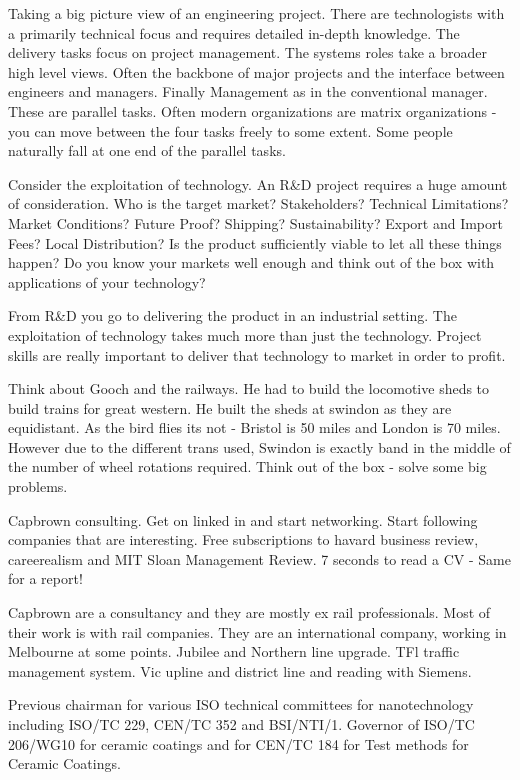 Taking a big picture view of an engineering project. There are technologists with a primarily technical focus and requires detailed in-depth knowledge. The delivery tasks focus on project management. The systems roles take a broader high level views. Often the backbone of major projects and the interface between engineers and managers. Finally Management as in the conventional manager. These are parallel tasks. Often modern organizations are matrix organizations - you can move between the four tasks freely to some extent. Some people naturally fall at one end of the parallel tasks.

Consider the exploitation of technology. An R\&D project requires a huge amount of consideration. Who is the target market? Stakeholders? Technical Limitations? Market Conditions? Future Proof? Shipping? Sustainability? Export and Import Fees? Local Distribution? Is the product sufficiently viable to let all these things happen? Do you know your markets well enough and think out of the box with applications of your technology?

From R\&D you go to delivering the product in an industrial setting. The exploitation of technology takes much more than just the technology. Project skills are really important to deliver that technology to market in order to profit.

Think about Gooch and the railways. He had to build the locomotive sheds to build trains for great western. He built the sheds at swindon as they are equidistant. As the bird flies its not - Bristol is 50 miles and London is 70 miles. However due to the different trans used, Swindon is exactly band in the middle of the number of wheel rotations required. Think out of the box - solve some big problems.

Capbrown consulting. Get on linked in and start networking. Start following companies that are interesting. Free subscriptions to havard business review, careerealism and MIT Sloan Management Review. 7 seconds to read a CV - Same for a report!

Capbrown are a consultancy and they are mostly ex rail professionals. Most of their work is with rail companies. They are an international company, working in Melbourne at some points. Jubilee and Northern line upgrade. TFl traffic management system. Vic upline and district line and reading with Siemens. 

\label{sec:lect3}
Previous chairman for various ISO technical committees for nanotechnology including ISO/TC 229, CEN/TC 352 and BSI/NTI/1. 
Governor of ISO/TC 206/WG10 for ceramic coatings and for CEN/TC 184 for Test methods for Ceramic Coatings.

